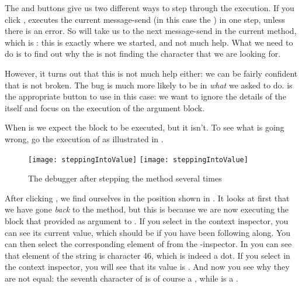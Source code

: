 \documentclass[a4paper,10pt,twoside]{book}
\begin{document}
The  and  buttons give us two different ways to step through the execution.  If you click , \sq executes the current message-send (in this case the ) in one step, unless there is an error.  
So  will take us to the next message-send in the current method, which is : this is exactly where we started, and not much help. 
What we need to do is to find out why the  is not finding the character that we are looking for.



However, it turns out that this is not much help either: we can be fairly confident that  is not broken.  The bug is much more likely to be in \emph{what} we asked \sq to do.
 is the appropriate button to use in this case: we want to ignore the details of the  itself and focus on the execution of the argument block. 


When  is  we expect the  block to be executed, but it isn't.
To see what is going wrong, go  the execution of  as illustrated in .

\begin{figure}[btp]
	\begin{center}
	\ifluluelse
		{\texttt{[image: steppingIntoValue]}}
		{\texttt{[image: steppingIntoValue]}}
	\end{center}
	\caption{The debugger after stepping  the  method several times}
	\label{fig:steppingIntoValue}
\end{figure}

After clicking , we find ourselves in the position shown in .
It looks at first that we have gone \emph{back} to the  method, but this is because we are now executing the block that  provided as argument to .  
If you select  in the context inspector, you can see its current value, which should be  if you have been following along.  
You can then select the corresponding element of \self from the \self{}-inspector.
In   you can see that element  of the string is character 46, which is indeed a dot.
If you select  in the context inspector, you will see that its value is .
And now you see why they are not equal: the seventh character of  is of course a , while  is a .
\end{document}
